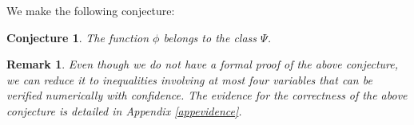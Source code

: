 \documentclass[conference,letterpaper,onecolumn]{IEEEtran}
\theoremstyle{plain}%
\newtheorem{rem}{Remark}
\newtheorem{conj}{Conjecture}
\begin{document}
 We make the following conjecture:
\begin{conj}
\label{conj:gue}
    The function $\phi$ belongs to the class $\Psi$. 
\end{conj}


\begin{rem}
Even though we do not have a formal proof of the above conjecture, we can reduce it to inequalities involving at most four variables that can be  verified numerically with confidence. The evidence for the correctness of the above conjecture is detailed in Appendix \ref{appevidence}.
\end{rem}







\end{document}
